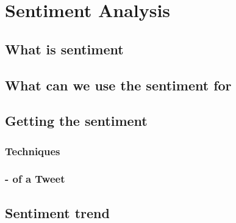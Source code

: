 
\section{Sentiment Analysis}

\subsection{What is sentiment}
\subsection{What can we use the sentiment for}
\subsection{Getting the sentiment}
\subsubsection{Techniques}
\subsubsection{- of a Tweet}

\subsection{Sentiment trend}
